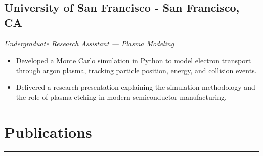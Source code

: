 \documentclass[11pt,a4paper]{article}
\newenvironment{myitemize}
{ \begin{itemize}[label={--}, leftmargin=*]
		\setlength{\itemsep}{0pt}
		\setlength{\parskip}{0pt}
		\setlength{\parsep}{0pt}     }
	{ \end{itemize}                  }
\begin{document}
\subsection*{University of San Francisco - San Francisco, CA \hfill
\vspace{-1mm} %
 }
\vspace{-1.5mm} %
\textit{Undergraduate Research Assistant — Plasma Modeling}
\vspace{-2.5mm} %
\begin{myitemize}
\item Developed a Monte Carlo simulation in Python to model electron transport through argon plasma, tracking particle position, energy, and collision events.
\item Delivered a research presentation explaining the simulation methodology and the role of plasma etching in modern semiconductor manufacturing.


	\end{myitemize}
		\vspace{-6mm} %
	
	
	
	\section*{Publications}
	\vspace{-3mm} %
	
	\hrule
	\vspace{2mm} %
	
	
	
		\vspace{-5mm} %
	
\end{document}
